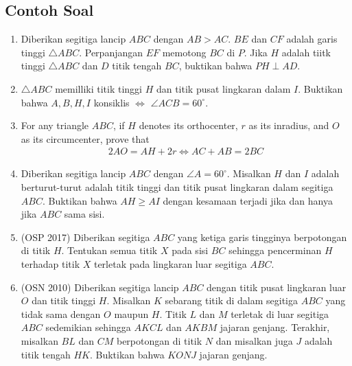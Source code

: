 \documentclass[11pt]{scrartcl}
\begin{document}
\subsection{Contoh Soal}
\begin{enumerate}
\item Diberikan segitiga lancip $ABC$ dengan $AB>AC$. $BE$ dan $CF$ adalah garis tinggi $\triangle ABC$. Perpanjangan $EF$ memotong $BC$ di $P$. Jika $H$ adalah tiitk tinggi $\triangle ABC$ dan $D$ titik tengah $BC$, buktikan bahwa $PH \perp AD$.

\item $\triangle ABC$ memilliki titik tinggi $H$ dan titik pusat lingkaran dalam $I$. Buktikan bahwa $A,B,H,I$ konsiklis $\iff$ $\angle ACB = 60^\circ$.

 \item For any triangle $ABC$, if $H$ denotes its orthocenter, $r$ as its inradius, and $O$ as its circumcenter, prove that 
 \begin{align*}
     2AO = AH + 2r \iff AC+AB=2BC
 \end{align*}

 \item Diberikan segitiga lancip $ABC$ dengan $\angle A = 60^\circ$. Misalkan $H$ dan $I$ adalah berturut-turut adalah titik tinggi dan titik pusat lingkaran dalam segitiga $ABC$. Buktikan bahwa $AH \ge AI$ dengan kesamaan terjadi jika dan hanya jika $ABC$ sama sisi.

 \item (OSP 2017) Diberikan segitiga $ABC$ yang ketiga garis tingginya berpotongan di titik $H$. Tentukan semua titik $X$ pada sisi $BC$ sehingga pencerminan $H$ terhadap titik $X$ terletak pada lingkaran luar segitiga $ABC$.

 \item (OSN 2010) Diberikan segitiga lancip $ABC$ dengan titik pusat lingkaran luar $O$ dan titik tinggi $H$. Misalkan $K$ sebarang titik di dalam segitiga $ABC$ yang tidak sama dengan $O$ maupun $H$. Titik $L$ dan $M$ terletak di luar segitiga $ABC$ sedemikian sehingga $AKCL$ dan $AKBM$ jajaran genjang. Terakhir, misalkan $BL$ dan $CM$ berpotongan di titik $N$ dan misalkan juga $J$ adalah titik tengah $HK$. Buktikan bahwa $KONJ$ jajaran genjang.
 \end{enumerate}
 
\end{document}
